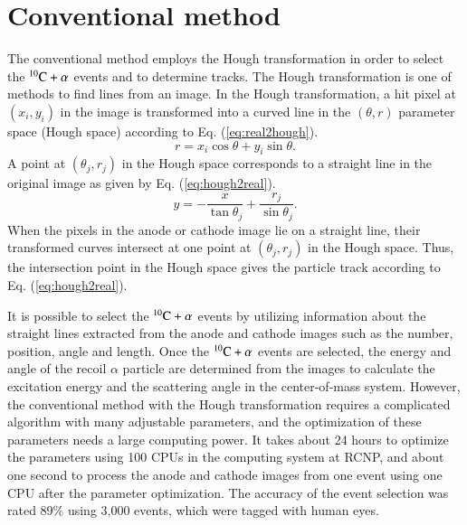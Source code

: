 \documentclass{jps-cp}
\begin{document}
\section{Conventional method}
The conventional method employs the Hough transformation in order to
select the ${}^{10}\rm{C}+\alpha$ events and to determine tracks.
The Hough transformation is one of methods to find lines from an image.
In the Hough transformation, a hit pixel at $(x_{i}, y_{i})$ in the image
is transformed into
a curved line in the $(\theta, r)$ parameter space (Hough space)
according to Eq. (\ref{eq:real2hough}).
\begin{equation}
  \label{eq:real2hough}
  r = x_{i}\cos\theta+y_{i}\sin\theta. 
\end{equation}
A point at $(\theta_{j}, r_{j})$ in the Hough space corresponds to a straight line
in the original image as given by Eq. (\ref{eq:hough2real}).
\begin{equation}
  \label{eq:hough2real}
  y = -\frac{x}{\tan\theta_{j}}+\frac{r_{j}}{\sin\theta_{j}}. 
\end{equation}
When the pixels in the anode or cathode image lie on a straight line,
their transformed curves intersect at one point at $(\theta_{j}, r_{j})$ in the Hough space.
Thus, the intersection point in the Hough space gives the particle track according to Eq. (\ref{eq:hough2real}).

It is possible to select the ${}^{10}\rm{C}+\alpha$ events by
utilizing information about the straight lines extracted from the anode and cathode images such as
the number, position, angle and length.
Once the ${}^{10}\rm{C}+\alpha$ events are selected, the energy and angle of the recoil $\alpha$ particle
are determined from the images to calculate the excitation energy and the scattering angle in the center-of-mass system.
However, the conventional method with the Hough transformation requires a complicated algorithm with many adjustable parameters,
and the optimization of these parameters needs a large computing power.
It takes about 24 hours to optimize the parameters using 100 CPUs
in the computing system at RCNP, 
and about one second to process the anode and cathode images from one event using one CPU after the parameter optimization.
The accuracy of the event selection was rated 89\% using 3,000 events,
which were tagged with human eyes.
\end{document}
